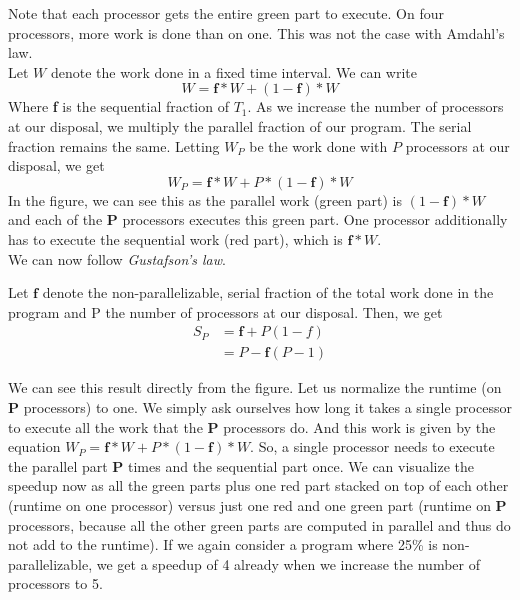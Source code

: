 \documentclass[main.tex]{subfiles}
\begin{document}
\noindent Note that each processor gets the entire green part to execute. On four processors, more work is done than on one. This was not the case with Amdahl's law.\\[3mm]
Let $W$ denote the work done in a fixed time interval. We can write
\begin{equation*}
    W = \mathbf{f} * W + (1 - \mathbf{f}) * W
\end{equation*}
Where \textbf{f} is the sequential fraction of $T_{1}$. As we increase the number of processors at our disposal, we multiply the parallel fraction of our program. The serial fraction remains the same. Letting $W_P$ be the work done with $P$ processors at our disposal, we get
\begin{equation*}
    W_P = \mathbf{f} * W + P * (1 - \mathbf{f}) * W
\end{equation*}
In the figure, we can see this as the parallel work (green part) is $(1-\mathbf{f}) * W$ and each of the \textbf{P} processors executes this green part. One processor additionally has to execute the sequential work (red part), which is $\mathbf{f}*W$.\\
We can now follow \textit{Gustafson's law}.
\begin{theorem}
    Let $\mathbf{f}$ denote the non-parallelizable, serial fraction of the total work done in the program and P the number of processors at our disposal. Then, we get
    \begin{align*}
        S_P &= \mathbf{f} + P(1-f)\\
            &= P - \mathbf{f}(P-1)
    \end{align*}
\end{theorem}
We can see this result directly from the figure. Let us normalize the runtime (on \textbf{P} processors) to one. We simply ask ourselves how long it takes a single processor to execute all the work that the \textbf{P} processors do. And this work is given by the equation $W_P = \mathbf{f} * W + P * (1 - \mathbf{f}) * W$. So, a single processor needs to execute the parallel part \textbf{P} times and the sequential part once. We can visualize the speedup now as all the green parts plus one red part stacked on top of each other (runtime on one processor) versus just one red and one green part (runtime on \textbf{P} processors, because all the other green parts are computed in parallel and thus do not add to the runtime).
If we again consider a program where 25\% is non-parallelizable, we get a speedup of 4 already when we increase the number of processors to 5.
\end{document}
